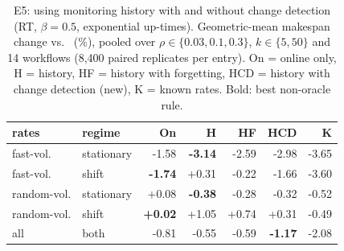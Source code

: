 \begin{table}[t]\centering\scriptsize
\caption{E5: using monitoring history with and without change detection (RT, $\beta=0.5$, exponential up-times). Geometric-mean makespan change vs.\ \EFT{} (\%), pooled over $\rho\in\{0.03,0.1,0.3\}$, $k\in\{5,50\}$ and 14 workflows (8{,}400 paired replicates per entry). On = online only, H = history, HF = history with forgetting, HCD = history with change detection (new), K = known rates. Bold: best non-oracle rule.}\label{tab:e5}
\setlength{\tabcolsep}{3pt}\begin{tabular}{llrrrrr}
\toprule
rates & regime & On & H & HF & HCD & K\\
\midrule
fast-vol. & stationary & -1.58 & \textbf{-3.14} & -2.59 & -2.98 & -3.65\\
fast-vol. & shift & \textbf{-1.74} & +0.31 & -0.22 & -1.66 & -3.60\\
random-vol. & stationary & +0.08 & \textbf{-0.38} & -0.28 & -0.32 & -0.52\\
random-vol. & shift & \textbf{+0.02} & +1.05 & +0.74 & +0.31 & -0.49\\
\midrule all & both & -0.81 & -0.55 & -0.59 & \textbf{-1.17} & -2.08\\
\bottomrule\end{tabular}\end{table}